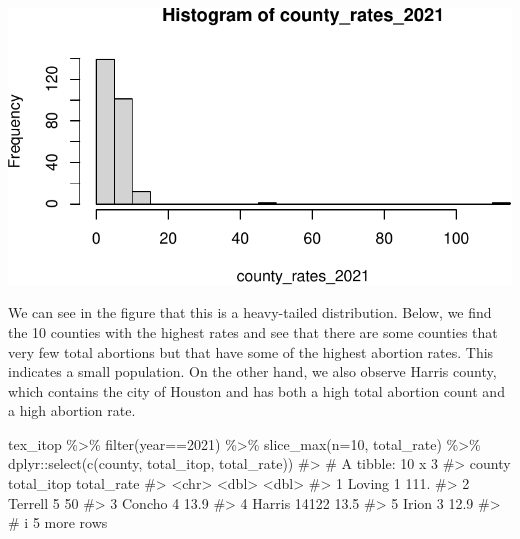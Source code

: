 \documentclass[
  letterpaper,
]{krantz}
\makeatletter
\newenvironment{Shaded}{\begin{snugshade}}{\end{snugshade}}
\newcommand{\AttributeTok}[1]{\textcolor[rgb]{0.40,0.45,0.13}{#1}}
\newcommand{\CommentTok}[1]{\textcolor[rgb]{0.37,0.37,0.37}{#1}}
\newcommand{\DecValTok}[1]{\textcolor[rgb]{0.68,0.00,0.00}{#1}}
\newcommand{\FunctionTok}[1]{\textcolor[rgb]{0.28,0.35,0.67}{#1}}
\newcommand{\NormalTok}[1]{\textcolor[rgb]{0.00,0.23,0.31}{#1}}
\newcommand{\OtherTok}[1]{\textcolor[rgb]{0.00,0.23,0.31}{#1}}
\newcommand{\SpecialCharTok}[1]{\textcolor[rgb]{0.37,0.37,0.37}{#1}}
\newenvironment{kframe}{%
\medskip{}
\setlength{\fboxsep}{.8em}
 \def\at@end@of@kframe{}%
 \ifinner\ifhmode%
  \def\at@end@of@kframe{\end{minipage}}%
  \begin{minipage}{\columnwidth}%
 \fi\fi%
 \def\FrameCommand##1{\hskip\@totalleftmargin \hskip-\fboxsep
 \colorbox{shadecolor}{##1}\hskip-\fboxsep
     \hskip-\linewidth \hskip-\@totalleftmargin \hskip\columnwidth}%
 \MakeFramed {\advance\hsize-\width
   \@totalleftmargin\z@ \linewidth\hsize
   \@setminipage}}%
 {\par\unskip\endMakeFramed%
 \at@end@of@kframe}
\renewenvironment{Shaded}{\begin{kframe}}{\end{kframe}}
\makeatother
\begin{document}
\begin{Shaded}
\end{Shaded}

\begin{center}
\includegraphics[width=1\textwidth,height=\textheight]{book/hypothesis_tests_files/figure-pdf/unnamed-chunk-2-1.pdf}
\end{center}

We can see in the figure that this is a heavy-tailed distribution.
Below, we find the 10 counties with the highest rates and see that there
are some counties that very few total abortions but that have some of
the highest abortion rates. This indicates a small population. On the
other hand, we also observe Harris county, which contains the city of
Houston and has both a high total abortion count and a high abortion
rate.

\begin{Shaded}
\begin{Highlighting}[]
\NormalTok{tex\_itop }\SpecialCharTok{\%\textgreater{}\%} 
  \FunctionTok{filter}\NormalTok{(year}\SpecialCharTok{==}\DecValTok{2021}\NormalTok{) }\SpecialCharTok{\%\textgreater{}\%} 
  \FunctionTok{slice\_max}\NormalTok{(}\AttributeTok{n=}\DecValTok{10}\NormalTok{, total\_rate) }\SpecialCharTok{\%\textgreater{}\%}
\NormalTok{  dplyr}\SpecialCharTok{::}\FunctionTok{select}\NormalTok{(}\FunctionTok{c}\NormalTok{(county, total\_itop, total\_rate))}
\CommentTok{\#\textgreater{} \# A tibble: 10 x 3}
\CommentTok{\#\textgreater{}   county  total\_itop total\_rate}
\CommentTok{\#\textgreater{}   \textless{}chr\textgreater{}        \textless{}dbl\textgreater{}      \textless{}dbl\textgreater{}}
\CommentTok{\#\textgreater{} 1 Loving           1      111. }
\CommentTok{\#\textgreater{} 2 Terrell          5       50  }
\CommentTok{\#\textgreater{} 3 Concho           4       13.9}
\CommentTok{\#\textgreater{} 4 Harris       14122       13.5}
\CommentTok{\#\textgreater{} 5 Irion            3       12.9}
\CommentTok{\#\textgreater{} \# i 5 more rows}
\end{Highlighting}
\end{Shaded}
\end{document}
